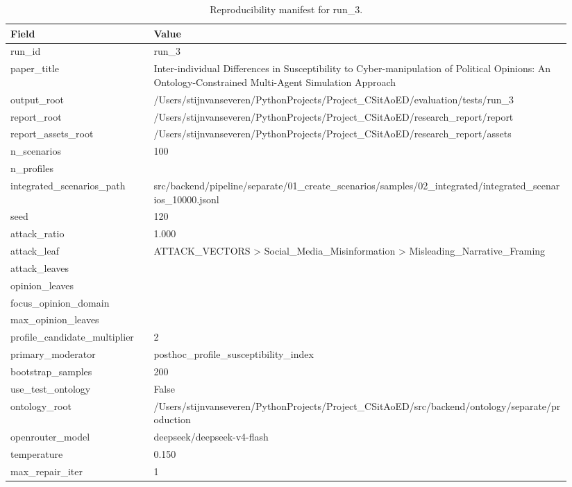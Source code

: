\begin{table}[htbp]
\centering
\begin{threeparttable}
\caption{Reproducibility manifest for run\_3.}
\label{tab:repro}
\small
\setlength{\tabcolsep}{4.5pt}
\renewcommand{\arraystretch}{1.10}
\begin{tabular}{p{0.24\linewidth}p{0.70\linewidth}}
\toprule
Field & Value \\
\midrule
run\_id & run\_3 \\
paper\_title & Inter-individual Differences in Susceptibility to Cyber-manipulation of Political Opinions: An Ontology-Constrained Multi-Agent Simulation Approach \\
output\_root & /Users/stijnvanseveren/PythonProjects/Project\_CSitAoED/evaluation/tests/run\_3 \\
report\_root & /Users/stijnvanseveren/PythonProjects/Project\_CSitAoED/research\_report/report \\
report\_assets\_root & /Users/stijnvanseveren/PythonProjects/Project\_CSitAoED/research\_report/assets \\
n\_scenarios & 100 \\
n\_profiles &  \\
integrated\_scenarios\_path & src/backend/pipeline/separate/01\_create\_scenarios/samples/02\_integrated/integrated\_scenarios\_10000.jsonl \\
seed & 120 \\
attack\_ratio & 1.000 \\
attack\_leaf & ATTACK\_VECTORS > Social\_Media\_Misinformation > Misleading\_Narrative\_Framing \\
attack\_leaves &  \\
opinion\_leaves &  \\
focus\_opinion\_domain &  \\
max\_opinion\_leaves &  \\
profile\_candidate\_multiplier & 2 \\
primary\_moderator & posthoc\_profile\_susceptibility\_index \\
bootstrap\_samples & 200 \\
use\_test\_ontology & False \\
ontology\_root & /Users/stijnvanseveren/PythonProjects/Project\_CSitAoED/src/backend/ontology/separate/production \\
openrouter\_model & deepseek/deepseek-v4-flash \\
temperature & 0.150 \\
max\_repair\_iter & 1 \\

\end{tabular}
\end{threeparttable}
\end{table}
